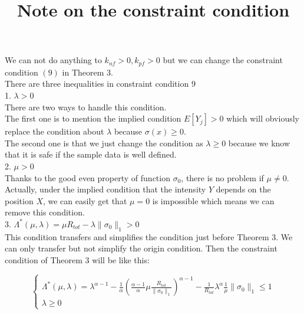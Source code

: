 \documentclass[12pt]{extarticle}
\title{Note on the constraint condition}
\begin{document}
\maketitle

We can not do anything to $k_{nf} > 0, k_{pf} > 0$ but we can change the constraint condition $(9)$ in Theorem 3. \\

There are three inequalities in constraint condition $9$ \\

1. $\lambda > 0$ \\

There are two ways to handle this condition. \\
The first one is to mention the implied condition $E[Y_j] > 0$ which will obviously replace the condition about $\lambda$ because $\sigma(x) \geq 0$. \\
The second one is that we just change the condition as $\lambda \geq 0$ because we know that it is safe if the sample data is well defined. \\

2. $\mu > 0$ \\

Thanks to the good even property of function $\sigma_0$, there is no problem if $\mu \neq 0$. Actually, under the implied condition that the intensity $Y$ depends on the position $X$, we can easily get that $\mu = 0$ is impossible which means we can remove this condition. \\

3. $\Lambda^{*}(\mu, \lambda) = \mu R_{tot} - \lambda \|\sigma_0\|_1 > 0$ \\
This condition transfers and simplifies the condition just before Theorem 3. We can only transfer but not simplify the origin condition. Then the constraint condition of Theorem 3 will be like this:

\begin{equation}
  \left\{
  \begin{array}{l}
    \Lambda^{*}(\mu, \lambda) = \lambda^{\alpha - 1} - \frac{1}{\alpha}\left(\frac{\alpha - 1}{\alpha}\mu\frac{R_{tot}}{\|\sigma_0\|_1}\right)^{\alpha - 1} - \frac{1}{R_{tot}}\lambda^{\alpha}\frac{1}{\mu}\|\sigma_0\|_1 \leq 1 \\
    \lambda \geq 0
  \end{array}\right.
\end{equation}
\end{document}
